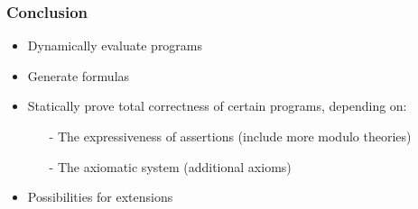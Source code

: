 \begin{frame}[c]
  \frametitle{Conclusion}
  \begin{itemize}
    \item Dynamically evaluate programs
    \item Generate formulas
    \item Statically prove total correctness of certain programs, depending on:
          \begin{itemize}
            \item[-] The expressiveness of assertions (include more modulo theories)
            \item[-] The axiomatic system (additional axioms)
          \end{itemize}
    \item Possibilities for extensions
  \end{itemize}
  \centering
  \Huge{👻}
\end{frame}

